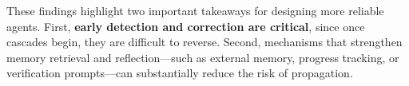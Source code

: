 These findings highlight two important takeaways for designing more reliable agents. First, \textbf{early detection and correction are critical}, since once cascades begin, they are difficult to reverse. Second, mechanisms that strengthen memory retrieval and reflection—such as external memory, progress tracking, or verification prompts—can substantially reduce the risk of propagation.








